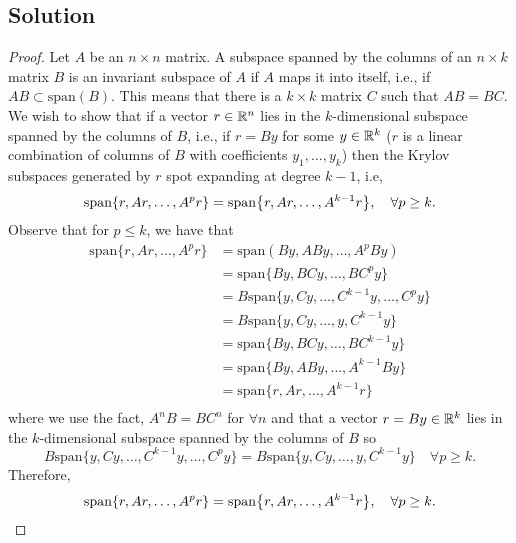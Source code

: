 \documentclass[12pt]{report}
\begin{document}
\begin{problem}
\subsection*{Solution}
\begin{proof}
    Let $A$ be an $n\times  n$ matrix. A subspace spanned by the columns of an $n \times k$ matrix $B$ is an invariant subspace of $A$ if $A$ maps it into itself, i.e., if $AB \subset \text{span}(B)$. This means that there is a $k \times k$ matrix $C$ such that $AB = BC$. We wish to show that if a vector $r \in {\mathbb R}^n$ lies in the $k$-dimensional subspace spanned by the columns of $B$, i.e., if $r = By$ for some $y \in {\mathbb R}^k$ ($r$ is a linear combination of columns of $B$ with coefficients $y_1, \dots , y_k$) then the Krylov subspaces generated by $r$ spot expanding at degree $k - 1$, i.e,
    \[
        \text{span}{\left\{r,Ar,\dots,A^pr\right\}} = \text{span}{\left\{r,Ar,\dots,A^{k-1}r\right\}}, \quad \forall p \geq k.
   \]
    Observe that for $p \leq k$, we have that
    \begin{align*}
        \text{span}\{r,Ar,\dots,A^{p}r\} &= \text{span}(By,ABy,\dots,A^{p}By)\\
        &= \text{span}\{By,BCy,\dots,BC^{p}y\}\\
        &= B\text{span}\{y,Cy,\dots,C^{k-1} y, \dots,C^{p} y\}\\
        &= B\text{span}\{y,Cy,\dots,y,C^{k-1}y\}\\
        &= \text{span}\{By,BCy,\dots,BC^{k-1} y\}\\
        &= \text{span}\{By,ABy,\dots,A^{k-1}By\}\\
        &= \text{span}\{r,Ar,\dots,A^{k-1}r\}\\
    \end{align*} 
    where we use the fact, $A^n B = BC^n$ for $\forall n$ and that a vector $r = By \in {\mathbb R}^k$ lies in the $k$-dimensional subspace spanned by the columns of $B$ so
    \[
     B\text{span}\{y,Cy,\dots,C^{k-1} y, \dots,C^{p} y\} = B\text{span}\{y,Cy,\dots,y,C^{k-1}y\} \quad \forall p \geq k.
    \]
     Therefore,
     \[
        \text{span}{\left\{r,Ar,\dots,A^pr\right\}} = \text{span}{\left\{r,Ar,\dots,A^{k-1}r\right\}}, \quad \forall p \geq k.
     \]








\end{proof}
\end{problem}
\end{document}
